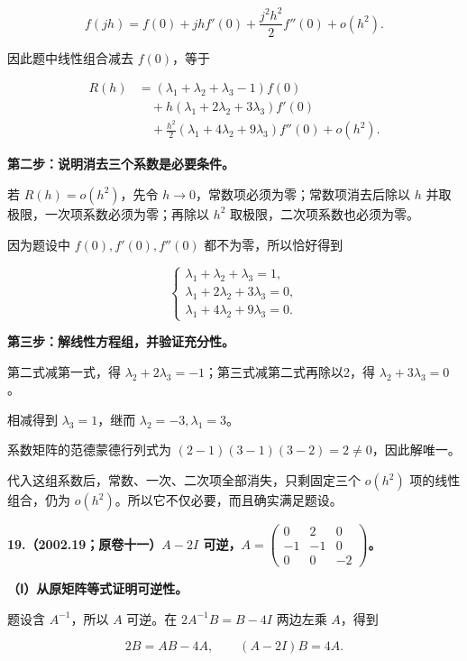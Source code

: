 \documentclass[UTF8,11pt,fontset=windows]{ctexart}
\begin{document}
$$
f(jh)=f(0)+jhf'(0)+\frac{j^2h^2}{2}f''(0)+o(h^2).
$$

因此题中线性组合减去 $f(0)$，等于

$$
\begin{aligned}
R(h)&=(\lambda_1+\lambda_2+\lambda_3-1)f(0)\\
&\quad+h(\lambda_1+2\lambda_2+3\lambda_3)f'(0)\\
&\quad+\frac{h^2}{2}(\lambda_1+4\lambda_2+9\lambda_3)f''(0)+o(h^2).
\end{aligned}
$$

\textbf{第二步：说明消去三个系数是必要条件。}

若 $R(h)=o(h^2)$，先令 $h\to0$，常数项必须为零；常数项消去后除以 $h$ 并取极限，一次项系数必须为零；再除以 $h^2$ 取极限，二次项系数也必须为零。

因为题设中 $f(0),f'(0),f''(0)$ 都不为零，所以恰好得到

$$
\begin{cases}
\lambda_1+\lambda_2+\lambda_3=1,\\
\lambda_1+2\lambda_2+3\lambda_3=0,\\
\lambda_1+4\lambda_2+9\lambda_3=0.
\end{cases}
$$

\textbf{第三步：解线性方程组，并验证充分性。}

第二式减第一式，得 $\lambda_2+2\lambda_3=-1$；第三式减第二式再除以2，得 $\lambda_2+3\lambda_3=0$。

相减得到 $\lambda_3=1$，继而 $\lambda_2=-3,\lambda_1=3$。

系数矩阵的范德蒙德行列式为 $(2-1)(3-1)(3-2)=2\ne0$，因此解唯一。

代入这组系数后，常数、一次、二次项全部消失，只剩固定三个 $o(h^2)$ 项的线性组合，仍为 $o(h^2)$。所以它不仅必要，而且确实满足题设。

\clearpage

\textbf{19.（2002.19；原卷十一）$A-2I$ 可逆，$A=\begin{pmatrix}0&2&0\\-1&-1&0\\0&0&-2\end{pmatrix}$。}

\textbf{（Ⅰ）从原矩阵等式证明可逆性。}

题设含 $A^{-1}$，所以 $A$ 可逆。在 $2A^{-1}B=B-4I$ 两边左乘 $A$，得到

$$
2B=AB-4A,
\qquad (A-2I)B=4A.
$$
\end{document}
